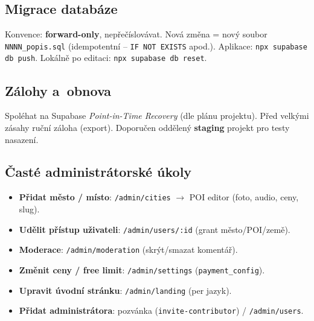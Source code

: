 \documentclass[11pt,a4paper]{article}
\newcommand{\code}[1]{\texttt{#1}}
\begin{document}
\subsection{Migrace databáze}
Konvence: \textbf{forward-only}, nepřečíslovávat. Nová změna = nový soubor
\code{NNNN\_popis.sql} (idempotentní -- \code{IF NOT EXISTS} apod.). Aplikace:
\code{npx supabase db push}. Lokálně po editaci: \code{npx supabase db reset}.

\subsection{Zálohy a~obnova}
Spoléhat na Supabase \emph{Point-in-Time Recovery} (dle plánu projektu). Před
velkými zásahy ruční záloha (export). Doporučen oddělený \textbf{staging} projekt
pro testy nasazení.

\subsection{Časté administrátorské úkoly}
\begin{itemize}[nosep]
  \item \textbf{Přidat město / místo}: \code{/admin/cities} $\rightarrow$ POI editor (foto, audio, ceny, slug).
  \item \textbf{Udělit přístup uživateli}: \code{/admin/users/:id} (grant město/POI/země).
  \item \textbf{Moderace}: \code{/admin/moderation} (skrýt/smazat komentář).
  \item \textbf{Změnit ceny / free limit}: \code{/admin/settings} (\code{payment\_config}).
  \item \textbf{Upravit úvodní stránku}: \code{/admin/landing} (per jazyk).
  \item \textbf{Přidat administrátora}: pozvánka (\code{invite-contributor}) / \code{/admin/users}.
\end{itemize}

\end{document}
